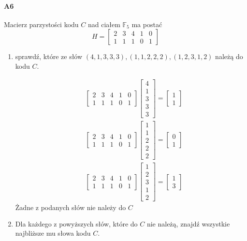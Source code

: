 \documentclass[a4paper,12pt]{article}
\theoremstyle{definition}%
\theoremstyle{definition}
\theoremstyle{problem}
\begin{document}
\paragraph{A6} Macierz parzystości kodu $C$ nad ciałem $\mathbb{F}_5$ ma postać
$$H =\begin{bmatrix}
2& 3& 4& 1& 0\\
1& 1& 1& 0& 1 
\end{bmatrix}$$
\begin{enumerate}[label=\alph*)]
\item sprawdź, które ze słów $(4, 1, 3, 3, 3),(1, 1, 2, 2, 2),(1, 2, 3, 1, 2)$ należą do kodu $C$.

\begin{align*}
&\begin{bmatrix}
2& 3& 4& 1& 0\\
1& 1& 1& 0& 1 
\end{bmatrix}\begin{bmatrix}
4\\ 1\\ 3\\ 3\\ 3
\end{bmatrix}=\begin{bmatrix}
1\\1
\end{bmatrix}\\
&\begin{bmatrix}
2& 3& 4& 1& 0\\
1& 1& 1& 0& 1 
\end{bmatrix}\begin{bmatrix}
1\\ 1\\ 2\\ 2\\ 2
\end{bmatrix}=\begin{bmatrix}
0\\1
\end{bmatrix}\\
&\begin{bmatrix}
2& 3& 4& 1& 0\\
1& 1& 1& 0& 1 
\end{bmatrix}\begin{bmatrix}
1\\ 2\\ 3\\ 1\\ 2
\end{bmatrix}=\begin{bmatrix}
1\\3
\end{bmatrix}
\end{align*}
Żadne z podanych słów nie należy do $C$
\item Dla każdego z powyższych słów, które do $C$ nie należą, znajdź wszystkie najbliższe mu słowa kodu $C$.


\end{enumerate}
\end{document}
